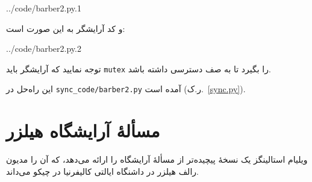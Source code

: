 \documentclass{book}
\newcommand{\clearemptydoublepage}{\newpage\cleardoublepage}
\begin{document}
\begin{latin}
%

{../code/barber2.py.1}
\end{latin}

	و کد آرایشگر به این صورت است:

\begin{latin}
%

{../code/barber2.py.2}
\end{latin}

	توجه نمایید که آرایشگر باید {\tt mutex} را بگیرد تا به صف دسترسی داشته باشد.

	این راه‌حل در \verb"sync_code/barber2.py" آمده است (ر.ک.~\ref{sync.py}).

\clearemptydoublepage
\section {مسألهٔ آرایشگاه هیلزر}

	ویلیام استالینگز \cite{stallings}  یک نسخهٔ پیچیده‌تر از مسألهٔ آرایشگاه را ارائه می‌دهد، 
	که آن را مدیون رالف هیلزر در داشنگاه ایالتی کالیفرنیا در چیکو می‌داند.
\end{document}
